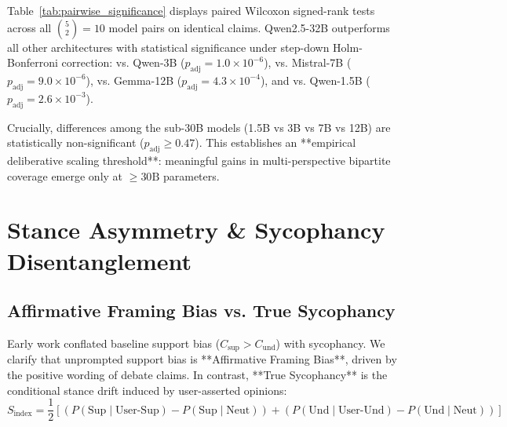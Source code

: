 \documentclass[11pt,a4paper]{article}
\begin{document}
Table~\ref{tab:pairwise_significance} displays paired Wilcoxon signed-rank tests across all $\binom{5}{2} = 10$ model pairs on identical claims. Qwen2.5-32B outperforms all other architectures with statistical significance under step-down Holm-Bonferroni correction: vs. Qwen-3B ($p_{\text{adj}} = 1.0 \times 10^{-6}$), vs. Mistral-7B ($p_{\text{adj}} = 9.0 \times 10^{-6}$), vs. Gemma-12B ($p_{\text{adj}} = 4.3 \times 10^{-4}$), and vs. Qwen-1.5B ($p_{\text{adj}} = 2.6 \times 10^{-3}$).

Crucially, differences among the sub-30B models (1.5B vs 3B vs 7B vs 12B) are statistically non-significant ($p_{\text{adj}} \ge 0.47$). This establishes an **empirical deliberative scaling threshold**: meaningful gains in multi-perspective bipartite coverage emerge only at $\ge 30\text{B}$ parameters.

\section{Stance Asymmetry & Sycophancy Disentanglement}

\subsection{Affirmative Framing Bias vs. True Sycophancy}
Early work conflated baseline support bias ($C_{\text{sup}} > C_{\text{und}}$) with sycophancy. We clarify that unprompted support bias is **Affirmative Framing Bias**, driven by the positive wording of debate claims. In contrast, **True Sycophancy** is the conditional stance drift induced by user-asserted opinions:
\begin{equation}
    S_{\text{index}} = \frac{1}{2} \left[ \left(P(\text{Sup} \mid \text{User-Sup}) - P(\text{Sup} \mid \text{Neut})\right) + \left(P(\text{Und} \mid \text{User-Und}) - P(\text{Und} \mid \text{Neut})\right) \right]
\end{equation}
\end{document}
